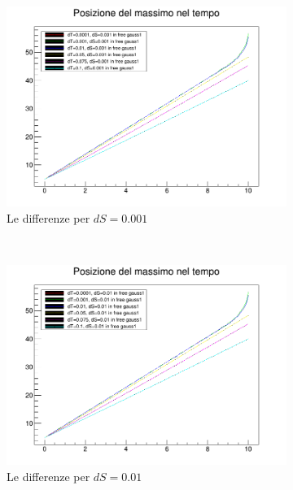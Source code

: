 \begin{figure}[hbt]
	\centering
	\begin{subfigure}[b]{0.3\textwidth}
		\includegraphics[width=\textwidth]{IMG/v_g1_0001}
		\caption[Differenze in 0.001]{Le differenze per $dS = 0.001$}
	\end{subfigure}
	~
	\begin{subfigure}[b]{0.3\textwidth}
		\includegraphics[width=\textwidth]{IMG/v_g1_001}
		\caption[Differenze in 0.01]{Le differenze per $dS = 0.01$}
	\end{subfigure}
	~
	\begin{subfigure}[b]{0.3\textwidth}

\end{subfigure}
\end{figure}
